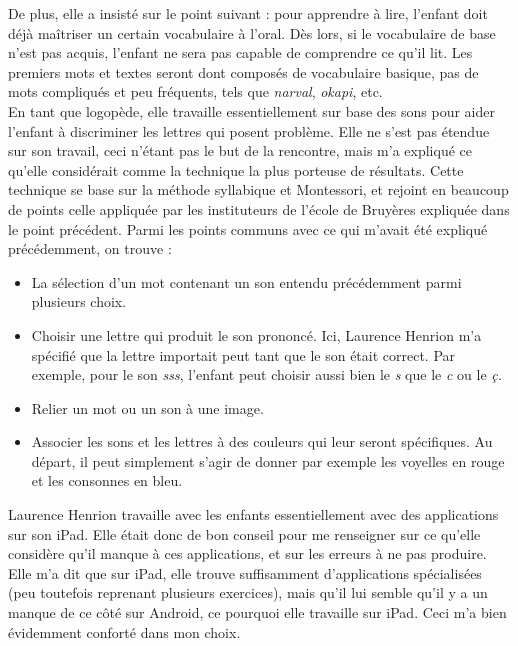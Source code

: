 De plus, elle a insisté sur le point suivant : pour apprendre à lire, l'enfant doit déjà maîtriser un certain vocabulaire à l'oral. Dès lors, si le vocabulaire de base n'est pas acquis, l'enfant ne sera pas capable de comprendre ce qu'il lit. Les premiers mots et textes seront dont composés de vocabulaire basique, pas de mots compliqués et peu fréquents, tels que \textit{narval}, \textit{okapi}, etc. \\

En tant que logopède, elle travaille essentiellement sur base des sons pour aider l'enfant à discriminer les lettres qui posent problème. Elle ne s'est pas étendue sur son travail, ceci n'étant pas le but de la rencontre, mais m'a  expliqué ce qu'elle considérait comme la technique la plus porteuse de résultats. Cette technique se base sur la méthode syllabique et Montessori, et rejoint en beaucoup de points celle appliquée par les instituteurs de l'école de Bruyères expliquée dans le point précédent. Parmi les points communs avec ce qui m'avait été expliqué précédemment, on trouve :
\begin{itemize}
\item La sélection d'un mot contenant un son entendu précédemment parmi plusieurs choix.
\item Choisir une lettre qui produit le son prononcé. Ici, Laurence Henrion m'a spécifié que la lettre importait peut tant que le son était correct. Par exemple, pour le son \textit{sss}, l'enfant peut choisir aussi bien le \textit{s} que le \textit{c} ou le \textit{ç.}
\item Relier un mot ou un son à une image.
\item Associer les sons et les lettres à des couleurs qui leur seront spécifiques. Au départ, il peut simplement s'agir de donner par exemple les voyelles en rouge et les consonnes en bleu.\\
\end{itemize}

Laurence Henrion travaille avec les enfants essentiellement avec des applications sur son iPad. Elle était donc de bon conseil pour me renseigner sur ce qu'elle considère qu'il manque à ces applications, et sur les erreurs à ne pas produire. Elle m'a dit que sur iPad, elle trouve suffisamment d'applications spécialisées (peu toutefois reprenant plusieurs exercices), mais qu'il lui semble qu'il y a un manque de ce côté sur Android, ce pourquoi elle travaille sur iPad. Ceci m'a bien évidemment conforté dans mon choix.\\

